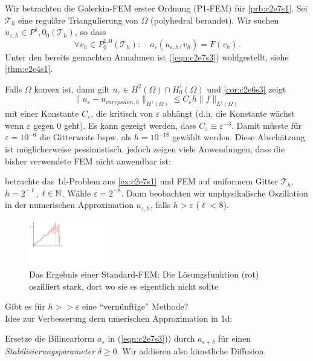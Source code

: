 \documentclass[../skript.tex]{subfiles}
\begin{document}
Wir betrachten die Galerkin-FEM erster Ordnung (P1-FEM) für \cref{prb:c2e7s1}. Sei $\mathcal{T}_h$ eine reguläre Triangulierung von $\Omega$ (polyhedral berandet). Wir suchen $u_{\varepsilon,h}\in P^1,0_0(\mathcal{T}_h)$, so dass 
\begin{equation}\label{eqn:c2e7s3}
	\forall v_h\in P^{1,0}_0(\mathcal{T}_h):\quad a_\varepsilon(u_{\varepsilon,h},v_h) = F(v_h).
\end{equation}
Unter den bereits gemachten Annahmen ist (\ref{eqn:c2e7s3}) wohlgestellt, siehe \cref{thm:c2e4s1}.\par
Falls $\Omega$ konvex ist, dann gilt $u_\varepsilon\in H^2(\Omega)\cap H^1_0(\Omega)$ und \cref{cor:c2e6s3} zeigt
\[
	\|u_\varepsilon-u_{varepsilon,h}\|_{H^1(\Omega)} \leq C_\varepsilon h\|f\|_{L^2(\Omega)}
\]
mit einer Konstante $C_\varepsilon$, die kritisch von $\varepsilon$ abhängt (d.h. die Konstante wächst wenn $\varepsilon$ gegen 0 geht). Es kann gezeigt werden, dass $C_\varepsilon \equiv \varepsilon^{-3}$. Damit müsste für $\varepsilon = 10^{-6}$ die Gitterweite bspw. als $h = 10^{-18}$ gewählt werden. Diese Abschätzung ist möglicherweise pessimistisch, jedoch zeigen viele Anwendungen, dass die bisher verwendete FEM nicht anwendbar ist:
\begin{example}\label{ex:c2e7s2}
	betrachte das 1d-Problem aus \cref{ex:c2e7s1} und FEM auf uniformem Gitter $\mathcal{T}_h$, $h=2^{-\ell}$, $\ell\in\mathbb{N}$. Wähle $\varepsilon = 2^{-8}$. Dann beobachten wir unphysikalische Oszillation in der numerischen Approximation $u_{\varepsilon,h}$, falls $h > \varepsilon$ ($\ell < 8$).
	\begin{figure}[ht]
	\centering
		\includegraphics[width=0.3\textwidth]{Images/5-12-oszillation.pdf}
		\caption{Das Ergebnis einer Standard-FEM: Die Lösungsfunktion (rot) oszilliert stark, dort wo sie es eigentlich nicht sollte}
		\label{figure_oszillation}
	\end{figure}
\end{example}
 Gibt es für $h>>\varepsilon$ eine ``vernünftige'' Methode?\\
 Idee zur Verbesserung dern umerischen Approximation in 1d:\par
 Ersetze die Bilinearform $a_\varepsilon$ in (\ref{eqn:c2e7s3})) durch $a_{\varepsilon+\delta}$ für einen \emph{Stabilisierungsparameter} $\delta \geq 0$. Wir addieren also künstliche Diffusion. 
\end{document}
